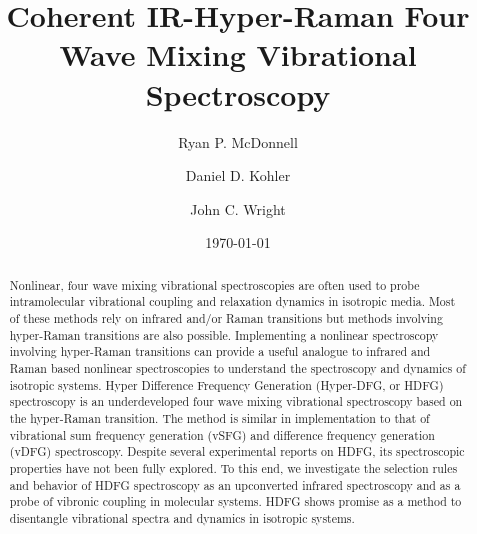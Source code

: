 \documentclass[aip, jcp, reprint, onecolumn]{revtex4-2}
\begin{document}
\title{Coherent IR-Hyper-Raman Four Wave Mixing Vibrational Spectroscopy}


\author{Ryan P. McDonnell} 
\author{Daniel D. Kohler}
\author{John C. Wright} 


\date{\today}

\begin{abstract}
Nonlinear, four wave mixing vibrational spectroscopies are often used to probe intramolecular vibrational coupling and relaxation dynamics in isotropic media.
Most of these methods rely on infrared and/or Raman transitions but methods involving hyper-Raman transitions are also possible. 
Implementing a nonlinear spectroscopy involving hyper-Raman transitions can provide a useful analogue to infrared and Raman based nonlinear spectroscopies to understand the spectroscopy and dynamics of isotropic systems.
Hyper Difference Frequency Generation (Hyper-DFG, or HDFG) spectroscopy is an underdeveloped four wave mixing vibrational spectroscopy based on the hyper-Raman transition. 
The method is similar in implementation to that of vibrational sum frequency generation (vSFG) and difference frequency generation (vDFG) spectroscopy.
Despite several experimental reports on HDFG, its spectroscopic properties have not been fully explored.  
To this end, we investigate the selection rules and behavior of HDFG spectroscopy as an upconverted infrared spectroscopy and as a probe of vibronic coupling in molecular systems.
HDFG shows promise as a method to disentangle vibrational spectra and dynamics in isotropic systems.

\end{abstract}

\maketitle
\end{document}
